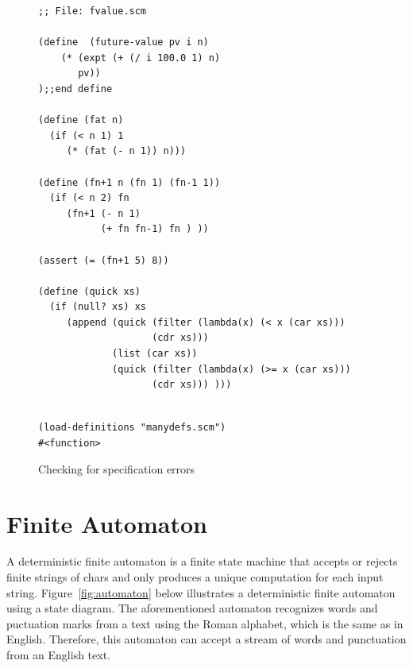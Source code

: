 \documentclass[a4paper,12pt]{book}
\newenvironment{fmpage}[1]
               {\begin{lrbox}{\fmbox}\begin{minipage}{#1}}
               {\end{minipage}\end{lrbox}\fbox{\usebox{\fmbox}}}
\begin{document}
\begin{figure}[!h]
\begin{fmpage}{0.9\textwidth}
\begin{verbatim}
;; File: fvalue.scm

(define  (future-value pv i n)
    (* (expt (+ (/ i 100.0 1) n) 
       pv))
);;end define

(define (fat n)
  (if (< n 1) 1
     (* (fat (- n 1)) n)))

(define (fn+1 n (fn 1) (fn-1 1))
  (if (< n 2) fn
     (fn+1 (- n 1)
           (+ fn fn-1) fn ) ))

(assert (= (fn+1 5) 8))

(define (quick xs)
  (if (null? xs) xs
     (append (quick (filter (lambda(x) (< x (car xs))) 
                    (cdr xs)))
             (list (car xs))
             (quick (filter (lambda(x) (>= x (car xs)))
                    (cdr xs))) )))


\end{verbatim}
\end{fmpage}

\begin{fmpage}{0.9\textwidth}
  \verb|(load-definitions "manydefs.scm")|\\
  \verb|#<function>|
\end{fmpage}
\caption{Checking for specification errors}
\label{debug-ready-source}
\end{figure}



\chapter{Finite Automaton}
\label{chap:finite-automaton}
A deterministic finite automaton
is a finite state machine that accepts or rejects
finite strings of chars and only produces
a unique computation  for each input string.
Figure~\ref{fig:automaton} below illustrates a deterministic
finite automaton using a state diagram.
The aforementioned automaton recognizes words
and puctuation marks from a text using
the Roman alphabet, which is the same
as in English. Therefore,
this automaton can  accept a
stream of words and punctuation from an English text.
\end{document}

